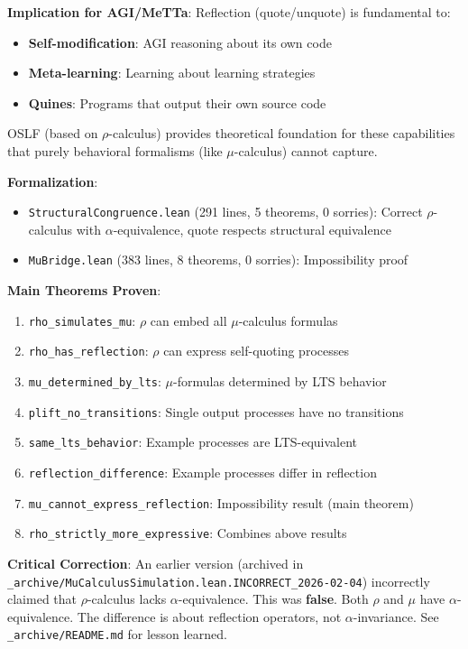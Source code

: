 \documentclass[11pt]{article}
\begin{document}
\textbf{Implication for AGI/MeTTa}: Reflection (quote/unquote) is fundamental to:
\begin{itemize}
\item \textbf{Self-modification}: AGI reasoning about its own code
\item \textbf{Meta-learning}: Learning about learning strategies
\item \textbf{Quines}: Programs that output their own source code
\end{itemize}

OSLF (based on $\rho$-calculus) provides theoretical foundation for these capabilities that purely behavioral formalisms (like $\mu$-calculus) cannot capture.

\textbf{Formalization}:
\begin{itemize}
\item \texttt{StructuralCongruence.lean} (291 lines, 5 theorems, 0 sorries): Correct $\rho$-calculus with $\alpha$-equivalence, quote respects structural equivalence
\item \texttt{MuBridge.lean} (383 lines, 8 theorems, 0 sorries): Impossibility proof
\end{itemize}

\textbf{Main Theorems Proven}:
\begin{enumerate}
\item \texttt{rho\_simulates\_mu}: $\rho$ can embed all $\mu$-calculus formulas
\item \texttt{rho\_has\_reflection}: $\rho$ can express self-quoting processes
\item \texttt{mu\_determined\_by\_lts}: $\mu$-formulas determined by LTS behavior
\item \texttt{plift\_no\_transitions}: Single output processes have no transitions
\item \texttt{same\_lts\_behavior}: Example processes are LTS-equivalent
\item \texttt{reflection\_difference}: Example processes differ in reflection
\item \texttt{mu\_cannot\_express\_reflection}: Impossibility result (main theorem)
\item \texttt{rho\_strictly\_more\_expressive}: Combines above results
\end{enumerate}

\textbf{Critical Correction}: An earlier version (archived in \texttt{\_archive/MuCalculusSimulation.lean.INCORRECT\_2026-02-04}) incorrectly claimed that $\rho$-calculus lacks $\alpha$-equivalence. This was \textbf{false}. Both $\rho$ and $\mu$ have $\alpha$-equivalence. The difference is about reflection operators, not $\alpha$-invariance. See \texttt{\_archive/README.md} for lesson learned.
\end{document}
